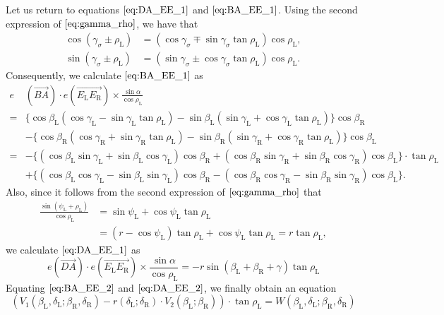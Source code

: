 \documentclass[11pt]{amsart}
\numberwithin{equation}{section}
\numberwithin{theorem}{section}
\newcommand{\Lt}{\ensuremath{\mathrm{L}}}
\newcommand{\Rt}{\ensuremath{\mathrm{R}}}
\newcommand{\ora}[1]{\ensuremath{\overrightarrow{#1}}}
\begin{document}
Let us return to equations $\eqref{eq:DA_EE_1}$ and $\eqref{eq:BA_EE_1}$.
Using the second expression of $\eqref{eq:gamma_rho}$, we have that
\begin{align*}
\cos (\gamma_\sigma\pm\rho_\Lt )&=(\cos\gamma_\sigma\mp\sin\gamma_\sigma \tan\rho_\Lt )\cos\rho_\Lt ,\\
\sin (\gamma_\sigma\pm\rho_\Lt )&=(\sin\gamma_\sigma\pm\cos\gamma_\sigma \tan\rho_\Lt )\cos\rho_\Lt .
\end{align*}
Consequently, we calculate $\eqref{eq:BA_EE_1}$ as
\begin{equation}\label{eq:BA_EE_2}
\begin{aligned}
e&(\ora{BA})\cdot e(\ora{E_\Lt E_\Rt})\times\frac{\sin\alpha}{\cos\rho_\Lt}\\
=&\{\cos\beta_\Lt (\cos\gamma_\Lt -\sin\gamma_\Lt\tan\rho_\Lt )-\sin\beta_\Lt (\sin\gamma_\Lt +\cos\gamma_\Lt\tan\rho_\Lt )\}\cos\beta_\Rt\\
&-\{\cos\beta_\Rt (\cos\gamma_\Rt +\sin\gamma_\Rt\tan\rho_\Lt )-\sin\beta_\Rt (\sin\gamma_\Rt +\cos\gamma_\Rt\tan\rho_\Lt )\}\cos\beta_\Lt\\
=&-\{(\cos\beta_\Lt\sin\gamma_\Lt +\sin\beta_\Lt\cos\gamma_\Lt )\cos\beta_\Rt
+(\cos\beta_\Rt\sin\gamma_\Rt +\sin\beta_\Rt\cos\gamma_\Rt )\cos\beta_\Lt\}\cdot\tan\rho_\Lt\\
&+\{(\cos\beta_\Lt\cos\gamma_\Lt -\sin\beta_\Lt\sin\gamma_\Lt )\cos\beta_\Rt -(\cos\beta_\Rt\cos\gamma_\Rt -\sin\beta_\Rt\sin\gamma_\Rt )\cos\beta_\Lt\}.
\end{aligned}
\end{equation}
Also, since it follows from the second expression of $\eqref{eq:gamma_rho}$ that
\begin{align*}
\frac{\sin (\psi_\Lt +\rho_\Lt )}{\cos\rho_\Lt}&=\sin\psi_\Lt +\cos\psi_\Lt\tan\rho_\Lt\\
&=(r-\cos\psi_\Lt )\tan\rho_\Lt +\cos\psi_\Lt \tan\rho_\Lt =r\tan\rho_\Lt ,
\end{align*}
we calculate $\eqref{eq:DA_EE_1}$ as
\begin{equation}\label{eq:DA_EE_2}
e(\ora{DA})\cdot e(\ora{E_\Lt E_\Rt})\times\frac{\sin\alpha}{\cos\rho_\Lt}=-r\sin(\beta_\Lt +\beta_\Rt +\gamma )\tan\rho_\Lt
\end{equation}
Equating $\eqref{eq:BA_EE_2}$ and $\eqref{eq:DA_EE_2}$, we finally obtain an equation
\begin{equation}\label{eq:DA_EE=BA_EE_alt_1}
(V_1(\beta_\Lt ,\delta_\Lt ;\beta_\Rt ,\delta_\Rt )-r(\delta_\Lt ;\delta_\Rt )\cdot V_2(\beta_\Lt ;\beta_\Rt ))\cdot\tan\rho_\Lt
=W(\beta_\Lt ,\delta_\Lt ;\beta_\Rt ,\delta_\Rt )
\end{equation}
\end{document}
